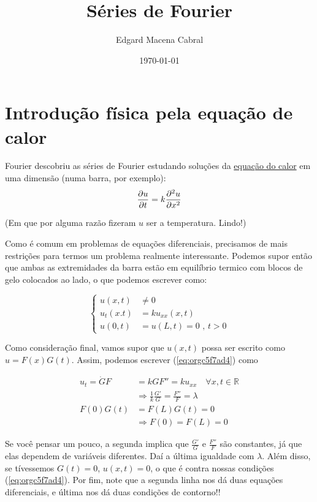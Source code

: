 \documentclass[11pt]{article}
\author{Edgard Macena Cabral}
\date{\today}
\title{Séries de Fourier}
\begin{document}
\maketitle
\tableofcontents


\section{Introdução física pela equação de calor}
\label{sec:orgfe21547}

Fourier descobriu as séries de Fourier estudando soluções da
\href{20211128141648-termodinamica.org}{equação do calor} em uma dimensão (numa barra, por exemplo):
\begin{equation}
\label{eq:org40a9b74}
\pdv{u}{t} = k \pdv[2]{u}{x} 
\end{equation}

(Em que por alguma razão fizeram \(u\) ser a temperatura. Lindo!)

Como é comum em problemas de equações diferenciais, precisamos de mais
restrições para termos um problema realmente interessante. Podemos supor
então que ambas as extremidades da barra estão em equilíbrio termico com
blocos de gelo colocados ao lado, o que podemos escrever como:

\begin{equation}
\label{eq:orgc5f7ad4}
\begin{cases}
  u(x,t) &\ne 0 \\
  u_t(x.t) &= ku_{xx}(x,t)\\
  u(0,t)&=u(L,t) = 0 \mbox{ ,  } t > 0
  \end{cases}
\end{equation} 

Como consideração final, vamos supor que \(u(x,t)\) possa ser escrito como \(u =
  F(x)G(t)\). Assim, podemos escrever (\ref{eq:orgc5f7ad4}) como

 \begin{align*}
 u_{t} = \dot{G}F &= kGF'' = ku_{x x} \quad  \forall x,t \in \mathbb{R}\\
 &\Rightarrow \frac{1}{k} \frac{G'}{G} = \frac{F''}{F} = \lambda\\
  F(0)G(t) &= F(L)G(t) = 0\\
&\Rightarrow F(0) = F(L) = 0
 \end{align*}

Se você pensar um pouco, a segunda implica que \(\frac{G'}{G}\)
e \(\frac{F''}{F}\) são constantes, já que elas dependem de variáveis
diferentes. Daí a última igualdade com \(\lambda\). Além disso, se tívessemos \(G(t) =
 0\), \(u(x,t) = 0\), o que é contra nossas condições (\ref{eq:orgc5f7ad4}). Por fim, note que a segunda linha nos dá duas equações
diferenciais, e última nos dá duas condições de contorno!!
\end{document}
